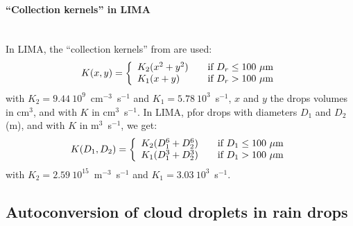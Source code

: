 \paragraph{``Collection kernels'' in LIMA}
~\\
In LIMA, the ``collection kernels'' from \citet{Long1974} are used:
\begin{align}
 K(x,y) = \left\{
  \begin{array}{l l}
    K_2 (x^2 + y^2) & \quad \text{if } D_r \leq 100~\mu\text{m} \\
    K_1 (x + y)     & \quad \text{if } D_r >  100~\mu\text{m}
  \end{array} \right.
\end{align}
with $K_2 = 9.44~10^{9}$~cm$^{-3}$~s$^{-1}$ and $K_1 = 5.78~10^{3}$~s$^{-1}$, $x$ and $y$ the drops volumes in cm$^3$, and with $K$ in cm$^3$~s$^{-1}$. In LIMA, pfor drops with diameters $D_1$ and $D_2$ (m), and with $K$ in m$^3$~s$^{-1}$, we get:
\begin{align}
 K(D_1,D_2) = \left\{
  \begin{array}{l l}
    K_2 (D_1^6 + D_2^6) & \quad \text{if } D_1 \leq 100~\mu\text{m} \\
    K_1 (D_1^3 + D_2^3) & \quad \text{if } D_1 >  100~\mu\text{m}
  \end{array} \right.
\end{align}
with $K_2 = 2.59~10^{15}$~m$^{-3}$~s$^{-1}$ and $K_1 = 3.03~10^{3}$~s$^{-1}$.

\subsection{Autoconversion of cloud droplets in rain drops}
\label{droplets-autoconversion}

